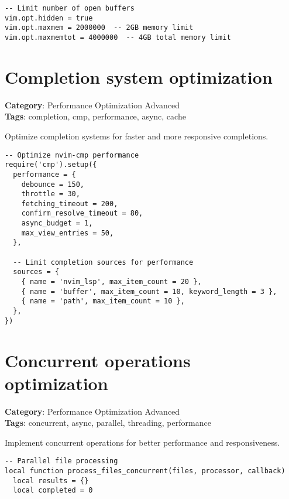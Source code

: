 {{{{{{{{{\begin{Exa*}{}
\begin{Verbatim}[fontsize=\footnotesize, breaklines, breakanywhere]
-- Limit number of open buffers
vim.opt.hidden = true
vim.opt.maxmem = 2000000  -- 2GB memory limit
vim.opt.maxmemtot = 4000000  -- 4GB total memory limit
\end{Verbatim}
\end{Exa*}

\section{Completion system optimization}

\textbf{Category}: Performance Optimization Advanced\\ \textbf{Tags}: completion, cmp, performance, async, cache
\vspace{0.5cm}

Optimize completion systems for faster and more responsive completions.

\begin{Exa*}{}
\begin{Verbatim}[fontsize=\footnotesize, breaklines, breakanywhere]
-- Optimize nvim-cmp performance
require('cmp').setup({
  performance = {
    debounce = 150,
    throttle = 30,
    fetching_timeout = 200,
    confirm_resolve_timeout = 80,
    async_budget = 1,
    max_view_entries = 50,
  },
  
  -- Limit completion sources for performance
  sources = {
    { name = 'nvim_lsp', max_item_count = 20 },
    { name = 'buffer', max_item_count = 10, keyword_length = 3 },
    { name = 'path', max_item_count = 10 },
  },
})
\end{Verbatim}
\end{Exa*}

\section{Concurrent operations optimization}

\textbf{Category}: Performance Optimization Advanced\\ \textbf{Tags}: concurrent, async, parallel, threading, performance
\vspace{0.5cm}

Implement concurrent operations for better performance and responsiveness.

\begin{Exa*}{}
\begin{Verbatim}[fontsize=\footnotesize, breaklines, breakanywhere]
-- Parallel file processing
local function process_files_concurrent(files, processor, callback)
  local results = {}
  local completed = 0
  

\end{Verbatim}
\end{Exa*}}}}}}}}}}
